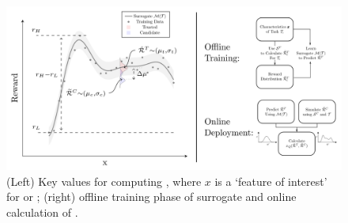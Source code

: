     
       \begin{figure}[tb]
        \centering
        \includegraphics[width=0.7\linewidth]{Figures/xQ_combined.png}
        \caption{(Left) Key values for computing \xQ, where $x$ is a `feature of interest' for \task or \solve; (right) offline training phase of surrogate \surrogate{} and online calculation of \xQ{}. }
        \label{fig:sq_v3}
        \vspace{-0.2cm}
    \end{figure}
    
